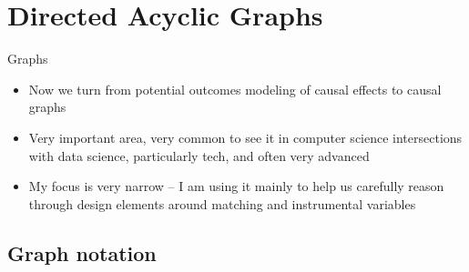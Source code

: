 \documentclass{beamer}
\begin{document}





\section{Directed Acyclic Graphs}

\begin{frame}{Graphs}

\begin{itemize}

\item Now we turn from potential outcomes modeling of causal effects to causal graphs
\item Very important area, very common to see it in computer science intersections with data science, particularly tech, and often very advanced
\item My focus is very narrow -- I am using it mainly to help us carefully reason through design elements around matching and instrumental variables

\end{itemize}

\end{frame}

\subsection{Graph notation}
\end{document}
